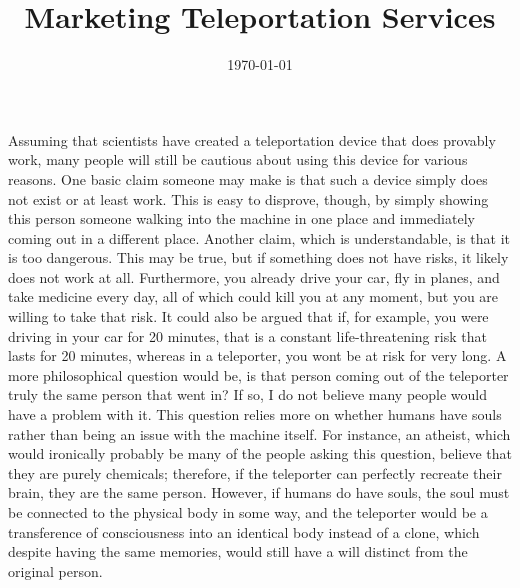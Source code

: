 \documentclass[12pt, letterpaper]{article}
\title{Marketing Teleportation Services}
\date{\today}
\begin{document}
\maketitle
Assuming that scientists have created a teleportation device that does provably work, many people will still be cautious about using this device for various reasons. One basic claim someone may make is that such a device simply does not exist or at least work. This is easy to disprove, though, by simply showing this person someone walking into the machine in one place and immediately coming out in a different place. Another claim, which is understandable, is that it is too dangerous. This may be true, but if something does not have risks, it likely does not work at all. Furthermore, you already drive your car, fly in planes, and take medicine every day, all of which could kill you at any moment, but you are willing to take that risk. It could also be argued that if, for example, you were driving in your car for 20 minutes, that is a constant life-threatening risk that lasts for 20 minutes, whereas in a teleporter, you wont be at risk for very long. A more philosophical question would be, is that person coming out of the teleporter truly the same person that went in? If so, I do not believe many people would have a problem with it. This question relies more on whether humans have souls rather than being an issue with the machine itself. For instance, an atheist, which would ironically probably be many of the people asking this question, believe that they are purely chemicals; therefore, if the teleporter can perfectly recreate their brain, they are the same person. However, if humans do have souls, the soul must be connected to the physical body in some way, and the teleporter would be a transference of consciousness into an identical body instead of a clone, which despite having the same memories, would still have a will distinct from the original person.
\end{document}
